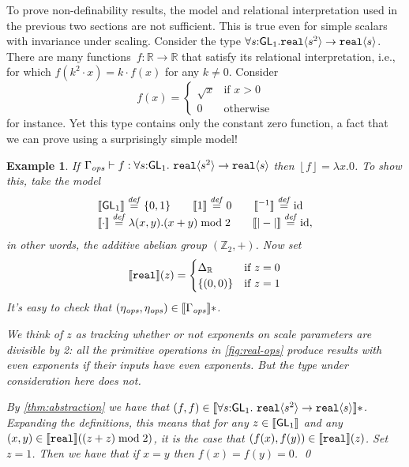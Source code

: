 \documentclass{sigplanconf}
\newcommand{\SynGL}[1]{\mathsf{GL}_#1}
\newcommand{\tyPrim}[2]{\textup{\texttt{#1}}\langle #2 \rangle}
\newcommand{\tyPrimNm}[1]{\textup{\texttt{#1}}}
\newcommand{\tmSem}[1]{\left\lfloor{#1}\right\rfloor}
\newcommand{\rsem}[1]{\llbracket #1 \rrbracket}
\newcommand{\isDefinedAs}{\stackrel{\mathit{def}}=}
\theoremstyle{examplestyle}
\newtheorem{example}{Example}
\theoremstyle{restatementstyle}
\begin{document}
\newcommand{\Grp}{\mathit{Gr}}
To prove non-definability results, the model and relational interpretation
used in the previous two sections are not sufficient.
This is true even for simple scalars with invariance under scaling.
Consider the type 
$\forall s \mathord: \SynGL{1}.\tyPrim{real}{s^2} \to \tyPrim{real}{s}$. 
There are many functions~$f: \mathbb R \to \mathbb R$
that satisfy its relational interpretation, i.e., for which $f(k^2\cdot x) = k\cdot f(x)$ for 
any $k\neq 0$.
Consider 
\[
f(x) = \begin{cases}\sqrt x & \text{if }x > 0\\0&\text{otherwise}\end{cases}
\]
for instance. Yet this type contains only the constant zero function, a fact that
we can prove using a surprisingly simple model!

\begin{example}\label{ex:sqrt-root-nondef}
If  $\opsCtxt \vdash f : \forall s \mathord: \SynGL{1}.\
\tyPrim{real}{s^2} \to \tyPrim{real}{s}$ 
then $\tmSem f = \lambda x.0$.
To show this, take the model
\[
\begin{array}{l}
\semSort{\SynGL{1}} \isDefinedAs \{0,1\}\qquad
\semIndexExp{1} \isDefinedAs 0 \qquad
\semIndexExp{{}^{-1}}  \isDefinedAs \mathrm{id}\\
\semIndexExp{\cdot} \isDefinedAs \lambda(x,y).(x+y)\mathrel{\mathrm{mod}} 2
\qquad
\semIndexExp{|-|} \isDefinedAs \mathrm{id},

\end{array}
\]
in other words, the additive abelian group $(\mathbb Z_2, +)$. 
Now set
\[
\semPrimType{\tyPrimNm{real}}(z) = 
  \begin{cases} \Delta_{\mathbb R} & \text{if }z=0\\
                      \{(0,0)\} & \text{if }z=1
\end{cases}
\]
It's easy to check that $(\opsEnv,\opsEnv)\in\rsem{\opsCtxt}*$.

We think of $z$ as tracking whether or not exponents on scale
parameters are divisible by 2: all the primitive operations in
\autoref{fig:real-ops} produce results with even exponents if their
inputs have even exponents. But the type under consideration here does
not.

By \autoref{thm:abstraction} we have that $(f,f)\in\rsem{\forall s
  \mathord: \SynGL{1}.\ \tyPrim{real}{s^2} \to \tyPrim{real}{s}} *$.
Expanding the definitions, this means that for any
$z\in\semSort{\SynGL{1}}$ and any
$(x,y)\in\semPrimType{\tyPrimNm{real}}((z+z)\mathrel\textrm{mod}2)$, it is the case that
$(f(x),f(y))\in\semPrimType{\tyPrimNm{real}}(z)$. Set $z = 1$.  
Then we have that if $x=y$ then $f(x)=f(y)=0$.
\qed
\end{example}
\end{document}
